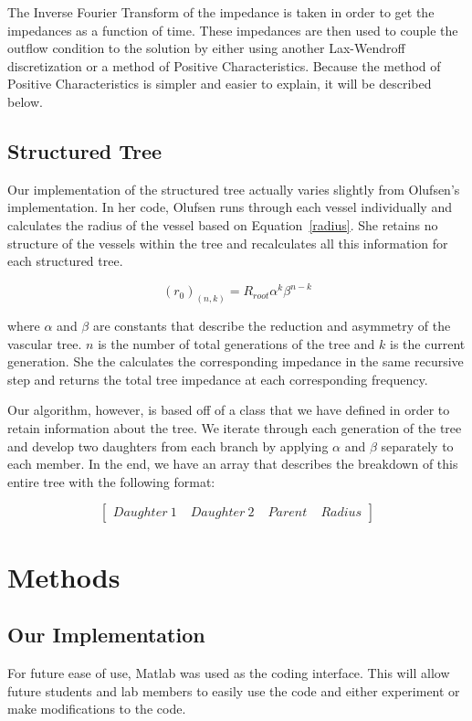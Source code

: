 \documentclass[12pt]{article}
\begin{document}
The Inverse Fourier Transform of the impedance is taken in order to get the impedances as a function of time. These impedances are then used to couple the outflow condition to the solution by either using another Lax-Wendroff discretization or a method of Positive Characteristics. Because the method of Positive Characteristics is simpler and easier to explain, it will be described below. 

\subsection{Structured Tree}
Our implementation of the structured tree actually varies slightly from Olufsen's implementation. In her code, Olufsen runs through each vessel individually and calculates the radius of the vessel based on Equation~\eqref{radius}. She retains no structure of the vessels within the tree and recalculates all this information for each structured tree.

\begin{equation}
	\label{radius}
	(r_0)_(n,k) = R_{root} \alpha^k\beta^{n-k}
\end{equation}

where $\alpha$ and $\beta$ are constants that describe the reduction and asymmetry of the vascular tree. $n$ is the number of total generations of the tree and $k$ is the current generation. She the calculates the corresponding impedance in the same recursive step and returns the total tree impedance at each corresponding frequency. 

Our algorithm, however, is based off of a class that we have defined in order to retain information about the tree. We iterate through each generation of the tree and develop two daughters from each branch by applying $\alpha$ and $\beta$ separately to each member. In the end, we have an array that describes the breakdown of this entire tree with the following format:

\begin{equation}
	\begin{bmatrix}
		Daughter \: 1 \; & Daughter \: 2 \; & Parent \; & Radius 
	\end{bmatrix}
\end{equation}

\section{Methods}
\subsection{Our Implementation}
For future ease of use, Matlab was used as the coding interface. This will allow future students and lab members to easily use the code and either experiment or make modifications to the code. 
\end{document}
